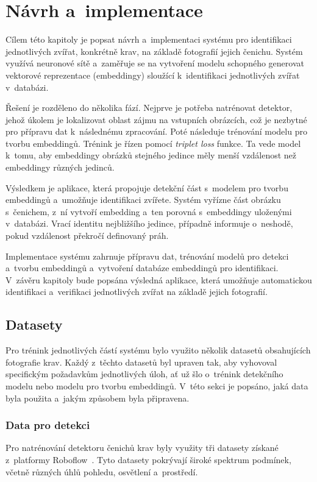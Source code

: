 \chapter{Návrh a~implementace}
\label{kap4}
Cílem této kapitoly je popsat návrh a~implementaci systému pro identifikaci jednotlivých zvířat, konkrétně krav, na základě fotografií jejich čenichu. Systém využívá neuronové sítě a~zaměřuje se na vytvoření modelu schopného generovat vektorové reprezentace (embeddingy) sloužící k~identifikaci jednotlivých zvířat v~databázi.

Řešení je rozděleno do několika fází. Nejprve je potřeba natrénovat detektor, jehož úkolem je lokalizovat oblast zájmu na vstupních obrázcích, což je nezbytné pro přípravu dat k~následnému zpracování. Poté následuje trénování modelu pro tvorbu embeddingů. Trénink je řízen pomocí \textit{triplet loss} funkce. Ta vede model k~tomu, aby embeddingy obrázků stejného jedince měly menší vzdálenost než embeddingy různých jedinců.

Výsledkem je aplikace, která propojuje detekční část s~modelem pro tvorbu embeddingů a~umožňuje identifikaci zvířete. Systém vyřízne část obrázku s~čenichem, z~ní vytvoří embedding a~ten porovná s~embeddingy uloženými v~databázi. Vrací identitu nejbližšího jedince, případně informuje o~neshodě, pokud vzdálenost překročí definovaný práh.

Implementace systému zahrnuje přípravu dat, trénování modelů pro detekci a~tvorbu embeddingů a~vytvoření databáze embeddingů pro identifikaci. V~závěru kapitoly bude popsána výsledná aplikace, která umožňuje automatickou identifikaci a~verifikaci jednotlivých zvířat na základě jejich fotografií.

\section{Datasety}
\label{datasets}
Pro trénink jednotlivých částí systému bylo využito několik datasetů obsahujících fotografie krav. Každý z~těchto datasetů byl upraven tak, aby vyhovoval specifickým požadavkům jednotlivých úloh, ať už šlo o~trénink detekčního modelu nebo modelu pro tvorbu embeddingů. V~této sekci je popsáno, jaká data byla použita a~jakým způsobem byla připravena.

\subsection*{Data pro detekci}
Pro natrénování detektoru čenichů krav byly využity tři datasety získané z~platformy Roboflow~\cite{dvc-5_dataset, muzzle-detection1_dataset, cow-rpgxt_dataset}. Tyto datasety pokrývají široké spektrum podmínek, včetně různých úhlů pohledu, osvětlení a~prostředí.


